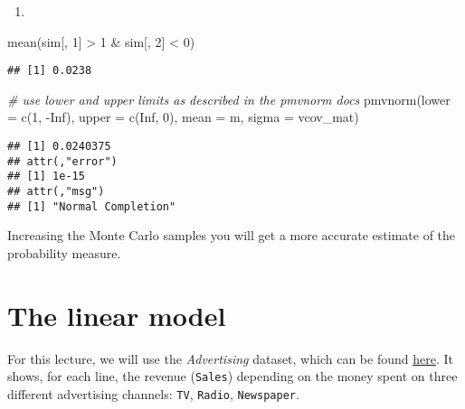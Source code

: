 \documentclass[
  oneside]{book}
\newenvironment{Shaded}{\begin{snugshade}}{\end{snugshade}}
\newcommand{\AttributeTok}[1]{\textcolor[rgb]{0.77,0.63,0.00}{#1}}
\newcommand{\CommentTok}[1]{\textcolor[rgb]{0.56,0.35,0.01}{\textit{#1}}}
\newcommand{\ConstantTok}[1]{\textcolor[rgb]{0.00,0.00,0.00}{#1}}
\newcommand{\DecValTok}[1]{\textcolor[rgb]{0.00,0.00,0.81}{#1}}
\newcommand{\FunctionTok}[1]{\textcolor[rgb]{0.00,0.00,0.00}{#1}}
\newcommand{\NormalTok}[1]{#1}
\newcommand{\SpecialCharTok}[1]{\textcolor[rgb]{0.00,0.00,0.00}{#1}}
\providecommand{\tightlist}{%
  \setlength{\itemsep}{0pt}\setlength{\parskip}{0pt}}
\begin{document}
\begin{enumerate}
\def\labelenumi{\alph{enumi}.}
\setcounter{enumi}{2}
\tightlist
\item
\end{enumerate}

\begin{Shaded}
\begin{Highlighting}[]
\FunctionTok{mean}\NormalTok{(sim[, }\DecValTok{1}\NormalTok{] }\SpecialCharTok{\textgreater{}} \DecValTok{1} \SpecialCharTok{\&}\NormalTok{ sim[, }\DecValTok{2}\NormalTok{] }\SpecialCharTok{\textless{}} \DecValTok{0}\NormalTok{)}
\end{Highlighting}
\end{Shaded}

\begin{verbatim}
## [1] 0.0238
\end{verbatim}

\begin{Shaded}
\begin{Highlighting}[]
\CommentTok{\# use lower and upper limits as described in the pmvnorm docs}
\FunctionTok{pmvnorm}\NormalTok{(}\AttributeTok{lower =} \FunctionTok{c}\NormalTok{(}\DecValTok{1}\NormalTok{, }\SpecialCharTok{{-}}\ConstantTok{Inf}\NormalTok{), }\AttributeTok{upper =} \FunctionTok{c}\NormalTok{(}\ConstantTok{Inf}\NormalTok{, }\DecValTok{0}\NormalTok{), }\AttributeTok{mean =}\NormalTok{ m, }\AttributeTok{sigma =}\NormalTok{ vcov\_mat)}
\end{Highlighting}
\end{Shaded}

\begin{verbatim}
## [1] 0.0240375
## attr(,"error")
## [1] 1e-15
## attr(,"msg")
## [1] "Normal Completion"
\end{verbatim}

Increasing the Monte Carlo samples you will get a more accurate estimate
of the probability measure.

\hypertarget{the-linear-model}{%
\chapter{The linear model}\label{the-linear-model}}

For this lecture, we will use the \emph{Advertising} dataset,
which can be found \href{https://www.kaggle.com/datasets/ashydv/advertising-dataset}{here}.
It shows, for each line, the revenue (\texttt{Sales}) depending on the
money spent on three different advertising channels: \texttt{TV}, \texttt{Radio}, \texttt{Newspaper}.
\end{document}
